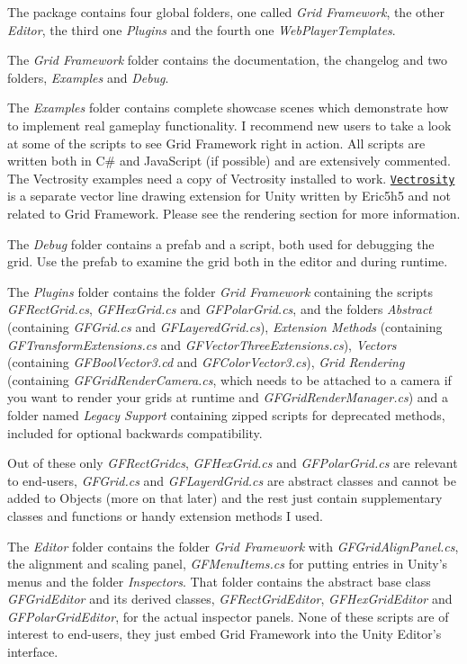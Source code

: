 The package contains four global folders, one called {\itshape Grid Framework}, the other {\itshape Editor}, the third one {\itshape Plugins} and the fourth one {\itshape Web\+Player\+Templates}.

The {\itshape Grid Framework} folder contains the documentation, the changelog and two folders, {\itshape Examples} and {\itshape Debug}.

The {\itshape Examples} folder contains complete showcase scenes which demonstrate how to implement real gameplay functionality. I recommend new users to take a look at some of the scripts to see Grid Framework right in action. All scripts are written both in C\# and Java\+Script (if possible) and are extensively commented. The Vectrosity examples need a copy of Vectrosity installed to work. \href{http://starscenesoftware.com/vectrosity.html/}{\tt Vectrosity} is a separate vector line drawing extension for Unity written by Eric5h5 and not related to Grid Framework. Please see the rendering section for more information.

The {\itshape Debug} folder contains a prefab and a script, both used for debugging the grid. Use the prefab to examine the grid both in the editor and during runtime.

The {\itshape Plugins} folder contains the folder {\itshape Grid Framework} containing the scripts {\itshape G\+F\+Rect\+Grid.\+cs}, {\itshape G\+F\+Hex\+Grid.\+cs} and {\itshape G\+F\+Polar\+Grid.\+cs}, and the folders {\itshape Abstract} (containing {\itshape G\+F\+Grid.\+cs} and {\itshape G\+F\+Layered\+Grid.\+cs}), {\itshape Extension Methods} (containing {\itshape G\+F\+Transform\+Extensions.\+cs} and {\itshape G\+F\+Vector\+Three\+Extensions.\+cs}), {\itshape Vectors} (containing {\itshape G\+F\+Bool\+Vector3.\+cd} and {\itshape G\+F\+Color\+Vector3.\+cs}), {\itshape Grid Rendering} (containing {\itshape G\+F\+Grid\+Render\+Camera.\+cs}, which needs to be attached to a camera if you want to render your grids at runtime and {\itshape G\+F\+Grid\+Render\+Manager.\+cs}) and a folder named {\itshape Legacy Support} containing zipped scripts for deprecated methods, included for optional backwards compatibility.

Out of these only {\itshape G\+F\+Rect\+Gridcs}, {\itshape G\+F\+Hex\+Grid.\+cs} and {\itshape G\+F\+Polar\+Grid.\+cs} are relevant to end-\/users, {\itshape G\+F\+Grid.\+cs} and {\itshape G\+F\+Layerd\+Grid.\+cs} are abstract classes and cannot be added to Objects (more on that later) and the rest just contain supplementary classes and functions or handy extension methods I used.

The {\itshape Editor} folder contains the folder {\itshape Grid Framework} with {\itshape G\+F\+Grid\+Align\+Panel.\+cs}, the alignment and scaling panel, {\itshape G\+F\+Menu\+Items.\+cs} for putting entries in Unity’s menus and the folder {\itshape Inspectors}. That folder contains the abstract base class {\itshape G\+F\+Grid\+Editor} and its derived classes, {\itshape G\+F\+Rect\+Grid\+Editor}, {\itshape G\+F\+Hex\+Grid\+Editor} and {\itshape G\+F\+Polar\+Grid\+Editor}, for the actual inspector panels. None of these scripts are of interest to end-\/users, they just embed Grid Framework into the Unity Editor’s interface.

 